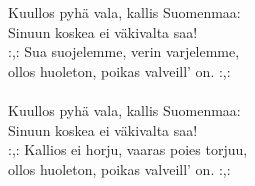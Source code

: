 
            Kuullos pyhä vala, kallis Suomenmaa: \\
            Sinuun koskea ei väkivalta saa! \\
            :,: Sua suojelemme, verin varjelemme, \\
            ollos huoleton, poikas valveill’ on. :,: \\
\hspace{10mm} \\
            Kuullos pyhä vala, kallis Suomenmaa: \\
            Sinuun koskea ei väkivalta saa! \\
            :,: Kallios ei horju, vaaras poies torjuu, \\
            ollos huoleton, poikas valveill’ on. :,: \\
